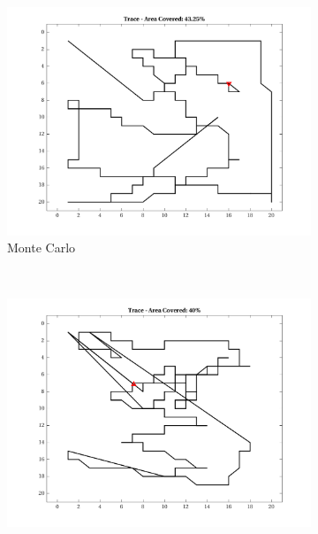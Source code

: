 \begin{figure}[htb!]
\begin{subfigure}[t]{0.3333\textwidth}
    \end{subfigure}%
    \begin{subfigure}[t]{0.3333\textwidth}
        \centering
        \includegraphics[width=\linewidth]{figures/hbresults/path_mc_40p_20x20_sf_4_seed_2.png}
        \ssp
        \captionsetup{skip=0.20\baselineskip,size=footnotesize}
        \caption{Monte Carlo}
    \end{subfigure}%
    \\
    \begin{subfigure}[t]{0.3333\textwidth}
        \centering
        \includegraphics[width=\linewidth]{figures/hbresults/path_nbv_40p_20x20_sf_4_seed_2.png}
        \ssp
        \captionsetup{skip=0.20\baselineskip,size=footnotesize}

\end{subfigure}
\end{figure}
